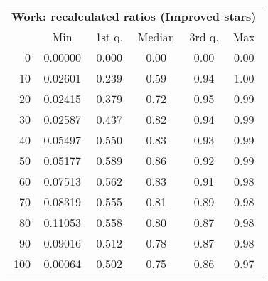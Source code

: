 \begin{tabular}{r|ccccc}
  \multicolumn{6}{c}{{\bf Work: recalculated ratios (Improved stars)}} \\
  & Min & 1st q. & Median & 3rd q. & Max \\ \hline\hline
  0 & 0.00000 & 0.000 & 0.00 & 0.00 & 0.00
\\ 10 & 0.02601 & 0.239 & 0.59 & 0.94 & 1.00
\\ 20 & 0.02415 & 0.379 & 0.72 & 0.95 & 0.99
\\ 30 & 0.02587 & 0.437 & 0.82 & 0.94 & 0.99
\\ 40 & 0.05497 & 0.550 & 0.83 & 0.93 & 0.99
\\ 50 & 0.05177 & 0.589 & 0.86 & 0.92 & 0.99
\\ 60 & 0.07513 & 0.562 & 0.83 & 0.91 & 0.98
\\ 70 & 0.08319 & 0.555 & 0.81 & 0.89 & 0.98
\\ 80 & 0.11053 & 0.558 & 0.80 & 0.87 & 0.98
\\ 90 & 0.09016 & 0.512 & 0.78 & 0.87 & 0.98
\\ 100 & 0.00064 & 0.502 & 0.75 & 0.86 & 0.97
\end{tabular}
